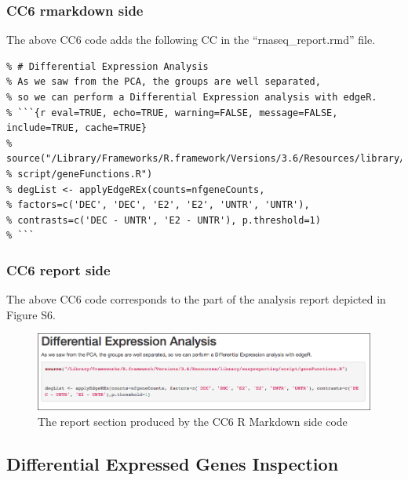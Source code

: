 \documentclass[]{article}
\begin{document}
\hypertarget{cc6-rmarkdown-side}{%
\subsubsection{CC6 rmarkdown side}\label{cc6-rmarkdown-side}}

The above CC6 code adds the following CC in the ``rnaseq\_report.rmd''
file.

\begin{verbatim}
% # Differential Expression Analysis
% As we saw from the PCA, the groups are well separated, 
% so we can perform a Differential Expression analysis with edgeR.
% ```{r eval=TRUE, echo=TRUE, warning=FALSE, message=FALSE, include=TRUE, cache=TRUE}
% source("/Library/Frameworks/R.framework/Versions/3.6/Resources/library/easyreporting/
% script/geneFunctions.R")
% degList <- applyEdgeREx(counts=nfgeneCounts, 
% factors=c('DEC', 'DEC', 'E2', 'E2', 'UNTR', 'UNTR'), 
% contrasts=c('DEC - UNTR', 'E2 - UNTR'), p.threshold=1)
% ```
\end{verbatim}

\hypertarget{cc6-report-side}{%
\subsubsection{CC6 report side}\label{cc6-report-side}}

The above CC6 code corresponds to the part of the analysis report
depicted in Figure S6.

\begin{figure}[ht]

{\centering \includegraphics[width=0.95\linewidth]{imgs/6} 

}

\caption{The report section produced by the CC6 R Markdown side code}\label{fig:unnamed-chunk-14}
\end{figure}

\newpage

\hypertarget{differential-expressed-genes-inspection}{%
\subsection{Differential Expressed Genes
Inspection}\label{differential-expressed-genes-inspection}}
\end{document}
